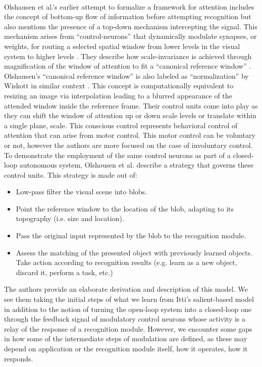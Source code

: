 \documentclass{report}
\begin{document}
\paragraph{}Olshausen et al.'s earlier attempt to formalize a framework for attention includes the concept of bottom-up flow of information before attempting recognition but also mentions the presence of a top-down mechanism intercepting the signal. This mechanism arises from ``control-neurons'' that dynamically modulate synapses, or weights, for routing a selected spatial window from lower levels in the visual system to higher levels \cite{Olshausen1993}. They describe how scale-invariance is achieved through magnification of the window of attention to fit a ``canonical reference window'' \cite{Olshausen1993}. Olshausen's ``canonical reference window'' is also labeled as ``normalization'' by Wiskott in similar context \cite{cogprints3321}. This concept is computationally equivalent to resizing an image via interpolation leading to a blurred appearance of the attended window inside the reference frame. Their control units come into play as they can shift the window of attention up or down scale levels or translate within a single plane, scale. This conscious control represents behavioral control of attention that can arise from motor control. This motor control can be voluntary or not, however the authors are more focused on the case of involuntary control. To demonstrate the employment of the same control neurons as part of a closed-loop autonomous system, Olshousen et al. describe a strategy that governs these control units.
This strategy is made out of:
\begin{itemize}
  \item Low-pass filter the visual scene into blobs.
  \item Point the reference window to the location of the blob, adapting to its topography (i.e. size and location).
  \item Pass the original input represented by the blob to the recognition module.
  \item Assess the matching of the presented object with previously learned objects. Take action according to recognition results (e.g. learn as a new object, discard it, perform a task, etc.) \cite{Olshausen1993}
\end{itemize}
The authors provide an elaborate derivation and description of this model. We see them taking the initial steps of what we learn from Itti's salient-based model in addition to the notion of turning the open-loop system into a closed-loop one through the feedback signal of modulatory control neurons whose activity is a relay of the response of a recognition module. However, we encounter some gaps in how some of the intermediate steps of modulation are defined, as these may depend on application or the recognition module itself, how it operates, how it responds. 
\end{document}
